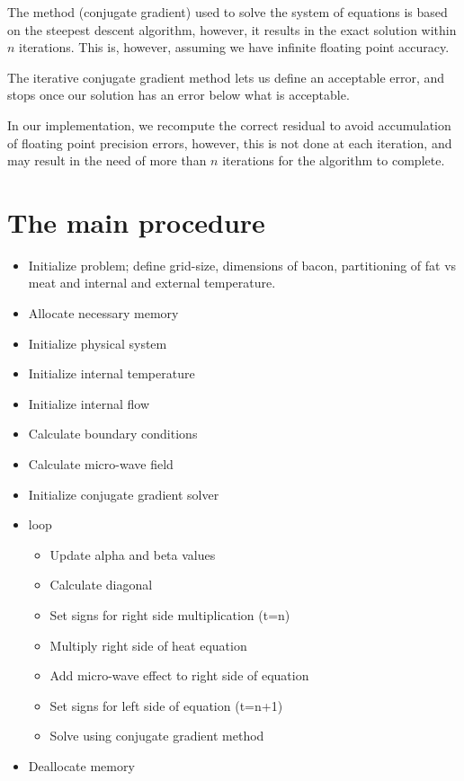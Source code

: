 The method (conjugate gradient) used to solve the system of equations is based on 
the steepest descent algorithm, however, it results in the exact solution within
$n$ iterations. This is, however, assuming we have infinite floating point accuracy.

The iterative conjugate gradient method lets us define an acceptable error, and stops
once our solution has an error below what is acceptable.

In our implementation, we recompute the correct residual to avoid accumulation of
floating point precision errors, however, this is not done at each iteration, and may
result in the need of more than $n$ iterations for the algorithm to complete.

\section{The main procedure}

\begin{itemize}
  \item Initialize problem; define grid-size, dimensions of bacon, partitioning of fat vs meat
  and internal and external temperature.
  \item Allocate necessary memory
  \item Initialize physical system
  \item Initialize internal temperature
  \item Initialize internal flow
  \item Calculate boundary conditions
  \item Calculate micro-wave field
  \item Initialize conjugate gradient solver
  \item loop
  \begin{itemize}
    \item Update alpha and beta values
    \item Calculate diagonal
    \item Set signs for right side multiplication (t=n)
    \item Multiply right side of heat equation
    \item Add micro-wave effect to right side of equation
    \item Set signs for left side of equation (t=n+1)
    \item Solve using conjugate gradient method
  \end{itemize}
\item Deallocate memory
\end{itemize}

